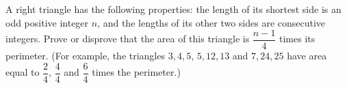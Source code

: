 A right triangle has the following properties: the length of its shortest side is an odd positive integer $n$, and the lengths of its other two sides are consecutive integers. Prove or disprove that the area of this triangle is $\dfrac{n-1}{4}$ times its perimeter. (For example, the triangles $3,4,5$, $5,12,13$ and $7,24,25$ have area equal to $\dfrac{2}{4}$, $\dfrac{4}{4}$ and $\dfrac{6}{4}$ times the perimeter.)
